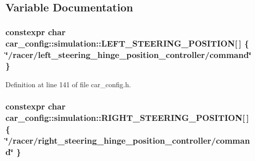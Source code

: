 \subsection{Variable Documentation}
\subsubsection[{\texorpdfstring{L\+E\+F\+T\+\_\+\+S\+T\+E\+E\+R\+I\+N\+G\+\_\+\+P\+O\+S\+I\+T\+I\+ON}{LEFT_STEERING_POSITION}}]{\setlength{\rightskip}{0pt plus 5cm}constexpr char car\+\_\+config\+::simulation\+::\+L\+E\+F\+T\+\_\+\+S\+T\+E\+E\+R\+I\+N\+G\+\_\+\+P\+O\+S\+I\+T\+I\+ON\mbox{[}$\,$\mbox{]} \{ \char`\"{}/racer/left\+\_\+steering\+\_\+hinge\+\_\+position\+\_\+controller/command\char`\"{} \}}\hypertarget{namespacecar__config_1_1simulation_a0547cf8102d3f1d49eab8cc27c199247}{}\label{namespacecar__config_1_1simulation_a0547cf8102d3f1d49eab8cc27c199247}


Definition at line 141 of file car\+\_\+config.\+h.

\subsubsection[{\texorpdfstring{R\+I\+G\+H\+T\+\_\+\+S\+T\+E\+E\+R\+I\+N\+G\+\_\+\+P\+O\+S\+I\+T\+I\+ON}{RIGHT_STEERING_POSITION}}]{\setlength{\rightskip}{0pt plus 5cm}constexpr char car\+\_\+config\+::simulation\+::\+R\+I\+G\+H\+T\+\_\+\+S\+T\+E\+E\+R\+I\+N\+G\+\_\+\+P\+O\+S\+I\+T\+I\+ON\mbox{[}$\,$\mbox{]} \{ \char`\"{}/racer/right\+\_\+steering\+\_\+hinge\+\_\+position\+\_\+controller/command\char`\"{} \}}\hypertarget{namespacecar__config_1_1simulation_a4f5267acab1b061953937bc84a7a6e28}{}\label{namespacecar__config_1_1simulation_a4f5267acab1b061953937bc84a7a6e28}


